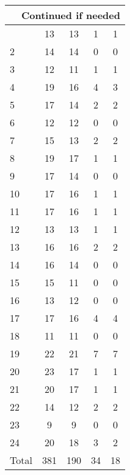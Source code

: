 \begin{center}
\begin{longtable}{l|c|c|c|c}
\hline \multicolumn{5}{|r|}{{Continued if needed}} \\ \hline
\endfoot 
1 & 13 & 13 & 1 & 1\\ \hline
2 & 14 & 14 & 0 & 0\\ \hline
3 & 12 & 11 & 1 & 1\\ \hline
4 & 19 & 16 & 4 & 3\\ \hline
5 & 17 & 14 & 2 & 2\\ \hline
6 & 12 & 12 & 0 & 0\\ \hline
7 & 15 & 13 & 2 & 2\\ \hline
8 & 19 & 17 & 1 & 1\\ \hline
9 & 17 & 14 & 0 & 0\\ \hline
10 & 17 & 16 & 1 & 1\\ \hline
11 & 17 & 16 & 1 & 1\\ \hline
12 & 13 & 13 & 1 & 1\\ \hline
13 & 16 & 16 & 2 & 2\\ \hline
14 & 16 & 14 & 0 & 0\\ \hline
15 & 15 & 11 & 0 & 0\\ \hline
16 & 13 & 12 & 0 & 0\\ \hline
17 & 17 & 16 & 4 & 4\\ \hline
18 & 11 & 11 & 0 & 0\\ \hline
19 & 22 & 21 & 7 & 7\\ \hline
20 & 23 & 17 & 1 & 1\\ \hline
21 & 20 & 17 & 1 & 1\\ \hline
22 & 14 & 12 & 2 & 2\\ \hline
23 & 9 & 9 & 0 & 0\\ \hline
24 & 20 & 18 & 3 & 2\\ \hline
\hline \hline
Total & 381 & 190 & 34 & 18




\end{longtable}
\end{center}




